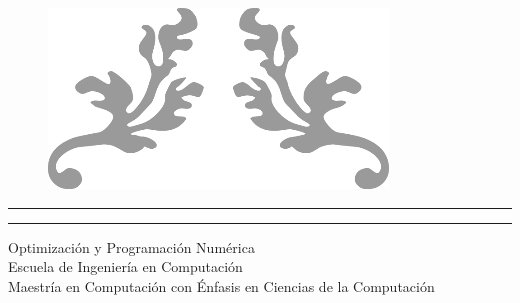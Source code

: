 \documentclass{article}
\begin{document}

\begin{titlepage} %

	\centering %
	
	\scshape %
	
	\vspace*{\baselineskip} %
	
	
	
	\begin{figure}[h]
    \centering
    \includegraphics{PortadaSuperior.png} 
    \end{figure}
    
	
	\rule{\textwidth}{1.6pt}\vspace*{-\baselineskip}\vspace*{2pt} %
	\rule{\textwidth}{0.4pt} %
	
	\vspace{0.75\baselineskip} %
	
	{\LARGE Optimización y Programación Numérica \\ Escuela de Ingeniería en Computación \\ Maestría en Computación con Énfasis en Ciencias de la Computación \\} %
	
	\vspace{0.75\baselineskip} %
	

\end{titlepage}
\end{document}
